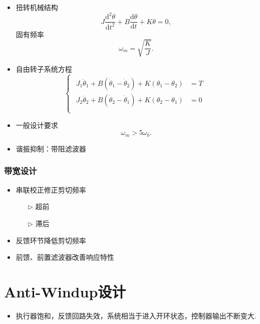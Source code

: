 \documentclass[14pt,a4paper]{article}
\theoremstyle{plain}
\theoremstyle{definition}
\theoremstyle{remark}
\theoremstyle{plain}
\theoremstyle{plain}
\theoremstyle{definition}
\begin{document}
			\begin{itemize}
				\item 扭转机械结构
					\[
					J \dfrac{\text{d}^2 \theta}{\text{d} t^2} + B \dfrac{\text{d} \theta}{\text{d} t} + K \theta = 0
					,\]
					固有频率
					\[
					\omega_{m} = \sqrt{\dfrac{K}{J}} 
					.\]
				\item 自由转子系统方程
					\[
					\begin{cases}
						\begin{aligned}
							J_1 \ddot \theta_1 + B \left( \dot \theta_1 - \dot \theta_2 \right) + K\left( \theta_1 -\theta_2 \right) &= T \\
							J_2 \ddot \theta_2 + B \left( \dot \theta_2 - \dot \theta_1 \right) + K\left( \theta_2 -\theta_1 \right) &= 0 \\
						\end{aligned}  
					\end{cases}
					\] 
				\item 一般设计要求
					\[
					\omega_{m} > 5 \omega_{b}
					.\] 
				\item 谐振抑制：带阻滤波器 
			\end{itemize}  

		\subsubsection{带宽设计}%
		\label{ssub:带宽设计}

			\begin{itemize}
				\item 串联校正修正剪切频率
					\begin{itemize}
						\item[$\triangleright$] 超前
						\item[$\triangleright$] 滞后 
					\end{itemize} 
				\item 反馈环节降低剪切频率
				\item 前馈、前置滤波器改善响应特性
			\end{itemize}  
			

	\newpage
	\section{Anti-Windup设计}%
	\label{sec:anti_windup设计}
	
		\begin{itemize}
			\item 执行器饱和，反馈回路失效，系统相当于进入开环状态，控制器输出不断变大. 
		\end{itemize}  	
\end{document}
